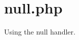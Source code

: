 \hypertarget{null_8php-example}{
\section{null.php}
}
Using the null handler.


\begin{DoxyCodeInclude}
\end{DoxyCodeInclude}
 
